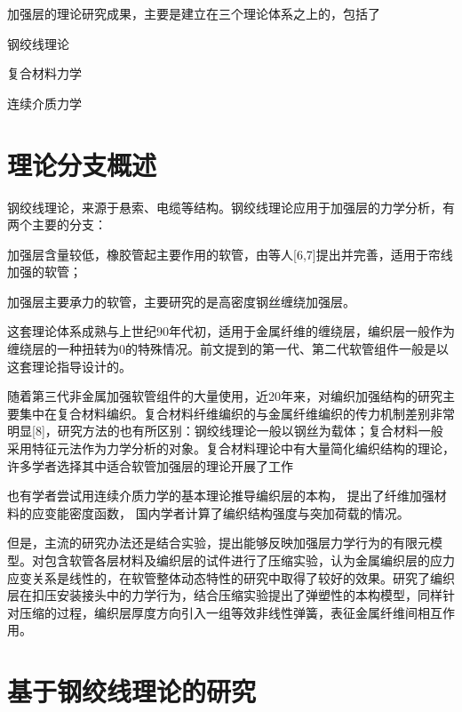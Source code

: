 加强层的理论研究成果，主要是建立在三个理论体系之上的，包括了
\begin{inparaenum}[1).]
	\item 钢绞线理论
	\item 复合材料力学
	\item 连续介质力学
\end{inparaenum}



\section{理论分支概述}
钢绞线理论，来源于悬索、电缆等结构。钢绞线理论应用于加强层的力学分析，有两个主要的分支\cite{Evans2002}：
\begin{inparaenum}[1).]
	\item 加强层含量较低，橡胶管起主要作用的软管，由\citeauthor{Kuipers1989}等人[6,7]提出并完善，适用于帘线加强的软管；
	\item 加强层主要承力的软管，主要研究的是高密度钢丝缠绕加强层。
\end{inparaenum}
这套理论体系成熟与上世纪90年代初，适用于金属纤维的缠绕层，编织层一般作为缠绕层的一种扭转为0的特殊情况。前文提到的第一代、第二代软管组件一般是以这套理论指导设计的。

随着第三代非金属加强软管组件的大量使用，近20年来，对编织加强结构的研究主要集中在复合材料编织。复合材料纤维编织的与金属纤维编织的传力机制差别非常明显[8]，研究方法的也有所区别：钢绞线理论一般以钢丝为载体；复合材料一般采用特征元法作为力学分析的对象。复合材料理论中有大量简化编织结构的理论，许多学者选择其中适合软管加强层的理论开展了工作



也有学者尝试用连续介质力学的基本理论推导编织层的本构，\citeauthor{Horgan2005}\cite{Horgan2005} 提出了纤维加强材料的应变能密度函数，
国内学者计算了编织结构强度与突加荷载的情况\cite{2009b}。

但是，主流的研究办法还是结合实验，提出能够反映加强层力学行为的有限元模型。\citeauthor{Wijaya2012}\cite{Wijaya2012}对包含软管各层材料及编织层的试件进行了压缩实验，认为金属编织层的应力应变关系是线性的，在软管整体动态特性的研究中取得了较好的效果。\citeauthor{Cho2005}\cite{Cho2005}研究了编织层在扣压安装接头中的力学行为，结合压缩实验提出了弹塑性的本构模型，\citeauthor{Rattensperger2003}\cite{Rattensperger2003}同样针对压缩的过程，编织层厚度方向引入一组等效非线性弹簧，表征金属纤维间相互作用。



\section{基于钢绞线理论的研究}


